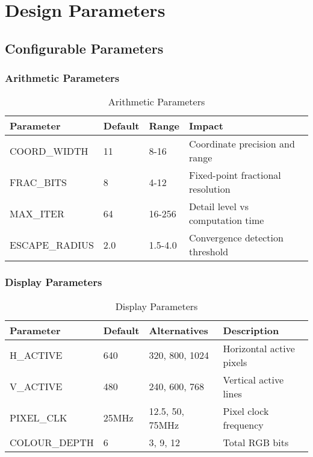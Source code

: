 \documentclass[11pt,a4paper]{article}
\begin{document}
\newpage
\section{Design Parameters}

\subsection{Configurable Parameters}

\subsubsection{Arithmetic Parameters}
\begin{table}[h]
\centering
\begin{tabularx}{\textwidth}{|l|l|l|X|}
\hline
\rowcolor{teal!20}
\textbf{Parameter} & \textbf{Default} & \textbf{Range} & \textbf{Impact} \\
\hline
COORD\_WIDTH & 11 & 8-16 & Coordinate precision and range \\
FRAC\_BITS & 8 & 4-12 & Fixed-point fractional resolution \\
MAX\_ITER & 64 & 16-256 & Detail level vs computation time \\
ESCAPE\_RADIUS & 2.0 & 1.5-4.0 & Convergence detection threshold \\
\hline
\end{tabularx}
\caption{Arithmetic Parameters}
\end{table}

\subsubsection{Display Parameters}
\begin{table}[h]
\centering
\begin{tabularx}{\textwidth}{|l|l|l|X|}
\hline
\rowcolor{cyan!20}
\textbf{Parameter} & \textbf{Default} & \textbf{Alternatives} & \textbf{Description} \\
\hline
H\_ACTIVE & 640 & 320, 800, 1024 & Horizontal active pixels \\
V\_ACTIVE & 480 & 240, 600, 768 & Vertical active lines \\
PIXEL\_CLK & 25MHz & 12.5, 50, 75MHz & Pixel clock frequency \\
COLOUR\_DEPTH & 6 & 3, 9, 12 & Total RGB bits \\
\hline
\end{tabularx}
\caption{Display Parameters}
\end{table}
\end{document}
